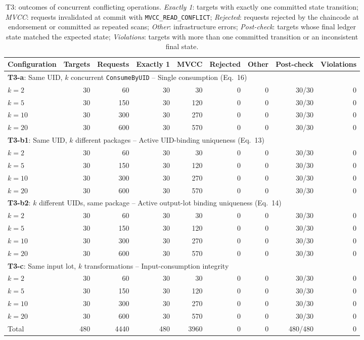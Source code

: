 \begin{table}[H]
\centering\small
\caption{T3: outcomes of concurrent conflicting operations. \emph{Exactly 1}: targets with exactly one
committed state transition; \emph{MVCC}: requests invalidated at commit with \texttt{MVCC\_READ\_CONFLICT};
\emph{Rejected}: requests rejected by the chaincode at endorsement or committed as repeated scans;
\emph{Other}: infrastructure errors; \emph{Post-check}: targets whose final ledger state matched the expected
state; \emph{Violations}: targets with more than one committed transition or an inconsistent final state.}
\label{tab:t3-outcomes}
\setlength{\tabcolsep}{4pt}
\begin{tabular}{lrrrrrrrr}
\toprule
Configuration & Targets & Requests & Exactly 1 & MVCC & Rejected & Other & Post-check & Violations \\
\midrule
\multicolumn{9}{l}{\textbf{T3-a}: Same UID, $k$ concurrent \texttt{ConsumeByUID} -- Single consumption (Eq.~16)} \\
\quad $k=2$ & 30 & 60 & 30 & 30 & 0 & 0 & 30/30 & 0 \\
\quad $k=5$ & 30 & 150 & 30 & 120 & 0 & 0 & 30/30 & 0 \\
\quad $k=10$ & 30 & 300 & 30 & 270 & 0 & 0 & 30/30 & 0 \\
\quad $k=20$ & 30 & 600 & 30 & 570 & 0 & 0 & 30/30 & 0 \\
\multicolumn{9}{l}{\textbf{T3-b1}: Same UID, $k$ different packages -- Active UID-binding uniqueness (Eq.~13)} \\
\quad $k=2$ & 30 & 60 & 30 & 30 & 0 & 0 & 30/30 & 0 \\
\quad $k=5$ & 30 & 150 & 30 & 120 & 0 & 0 & 30/30 & 0 \\
\quad $k=10$ & 30 & 300 & 30 & 270 & 0 & 0 & 30/30 & 0 \\
\quad $k=20$ & 30 & 600 & 30 & 570 & 0 & 0 & 30/30 & 0 \\
\multicolumn{9}{l}{\textbf{T3-b2}: $k$ different UIDs, same package -- Active output-lot binding uniqueness (Eq.~14)} \\
\quad $k=2$ & 30 & 60 & 30 & 30 & 0 & 0 & 30/30 & 0 \\
\quad $k=5$ & 30 & 150 & 30 & 120 & 0 & 0 & 30/30 & 0 \\
\quad $k=10$ & 30 & 300 & 30 & 270 & 0 & 0 & 30/30 & 0 \\
\quad $k=20$ & 30 & 600 & 30 & 570 & 0 & 0 & 30/30 & 0 \\
\multicolumn{9}{l}{\textbf{T3-c}: Same input lot, $k$ transformations -- Input-consumption integrity} \\
\quad $k=2$ & 30 & 60 & 30 & 30 & 0 & 0 & 30/30 & 0 \\
\quad $k=5$ & 30 & 150 & 30 & 120 & 0 & 0 & 30/30 & 0 \\
\quad $k=10$ & 30 & 300 & 30 & 270 & 0 & 0 & 30/30 & 0 \\
\quad $k=20$ & 30 & 600 & 30 & 570 & 0 & 0 & 30/30 & 0 \\
\midrule
Total & 480 & 4440 & 480 & 3960 & 0 & 0 & 480/480 & 0 \\
\bottomrule
\end{tabular}
\end{table}

